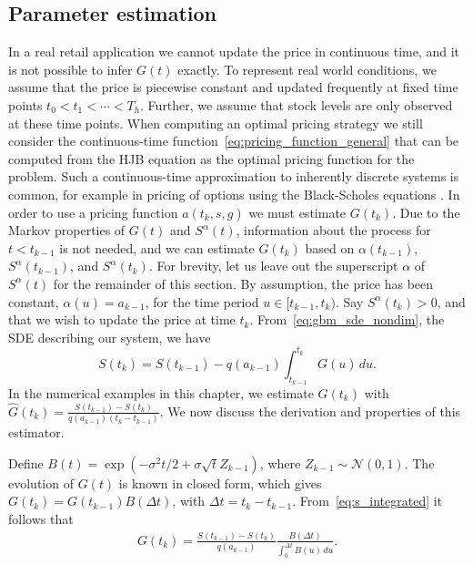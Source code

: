 \documentclass[main.tex]{subfiles}
\begin{document}
\subsection{Parameter estimation}\label{subsec:param_estim}
In a real retail application we cannot update the price in continuous
time, and it is not possible to infer $G(t)$ exactly.
To represent real world conditions, we assume that
the price is piecewise constant and updated frequently at fixed time points
$t_0<t_1<\cdots<T_h$.
Further, we assume that stock levels are only observed at these time
points. When computing an optimal pricing strategy
we still consider the continuous-time
function~\eqref{eq:pricing_function_general} that can be computed from
the HJB equation as
the optimal pricing function for the problem. Such a continuous-time
approximation to inherently discrete systems is common, for example
in pricing of options using the Black-Scholes equations
\citep{black1973pricing}.
In order to use a pricing function $a(t_k,s,g)$ we must estimate
$G(t_k)$.
Due to the Markov properties of $G(t)$ and $S^{\alpha}(t)$, information
about the process for $t<t_{k-1}$ is not needed, and we can estimate
$G(t_k)$ based on $\alpha(t_{k-1})$, $S^\alpha(t_{k-1})$, and $S^\alpha(t_k)$.
For brevity, let us leave out the superscript $\alpha$ of
$S^\alpha(t)$ for the remainder of this section.
By assumption, the price has been constant, $\alpha(u)=a_{k-1}$, for the time
period $u\in[t_{k-1},t_{k})$. Say $S^\alpha(t_{k})>0$, and that we wish to update the price at time
$t_{k}$.
From~\eqref{eq:gbm_sde_nondim}, the SDE describing our system, we have
\begin{equation}\label{eq:s_integrated}
  S(t_{k})=S(t_{k-1})-q(a_{k-1})\int_{t_{k-1}}^{t_{k}}G(u)\,du.
\end{equation}
In the numerical examples in this chapter, we estimate $G(t_{k})$ with
$\hat G(t_{k})=\frac{S(t_{k-1})-S(t_{k})}{q(a_{k-1})(t_{k}-t_{k-1})}$.
We now discuss the derivation and properties of this estimator.

Define $B(t) =  \exp(-\sigma^2 t/2+\sigma\sqrt{t}Z_{k-1})$, where $Z_{k-1}\sim
\mathcal{N}(0,1)$. The evolution of $G(t)$ is known in closed form,
which gives
$G(t_{k})=G(t_{k-1})B(\Delta t)$, with $\Delta t = t_{k}-t_{k-1}$.
From~\eqref{eq:s_integrated} it follows that
\begin{align}
  G(t_{k}) = \frac{S(t_{k-1})-S(t_{k})}{q(a_{k-1})}\frac{B(\Delta
  t)}{\int_{0}^{\Delta t}B(u)\,du}.
\end{align}
\end{document}
